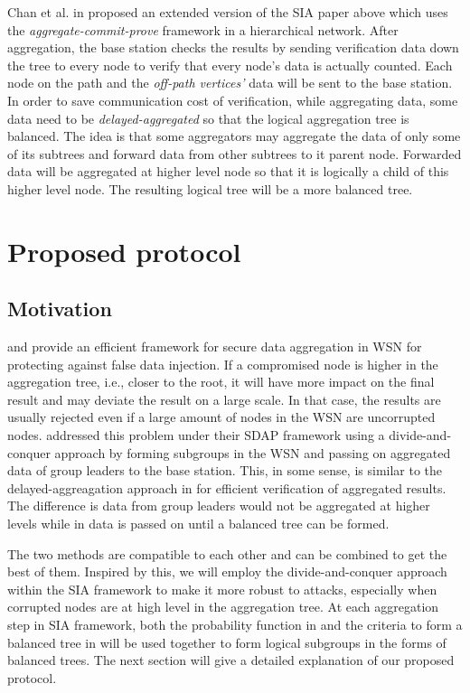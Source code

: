 \documentclass[a4paper]{article}
\begin{document}
Chan et al. in \cite{Chan06} proposed an extended version of the SIA paper
above which uses the {\em aggregate-commit-prove} framework in a hierarchical
network. After aggregation, the base station checks the results by sending
verification data down the tree to every node to verify that every node's data
is actually counted. Each node on the path and the {\em off-path vertices'}
data will be sent to the base station.  In order to save communication cost of
verification, while aggregating data, some data need to be {\em
  delayed-aggregated} so that the logical aggregation tree is balanced.  The
idea is that some aggregators may aggregate the data of only some of its
subtrees and forward data from other subtrees to it parent node. Forwarded
data will be aggregated at higher level node so that it is logically a child
of this higher level node. The resulting logical tree will be a more balanced
tree.

\section{Proposed protocol}
\label{sec:protocol}

\subsection{Motivation}

\cite{SIA} and \cite{Chan06} provide an efficient framework for secure data
aggregation in WSN for protecting against false data injection. If a
compromised node is higher in the aggregation tree, i.e., closer to the root,
it will have more impact on the final result and may deviate the result on a
large scale.  In that case, the results are usually rejected even if a large
amount of nodes in the WSN are uncorrupted nodes. \cite{SDAP} addressed this
problem under their SDAP framework using a divide-and-conquer approach by
forming subgroups in the WSN and passing on aggregated data of group leaders
to the base station. This, in some sense, is similar to the
delayed-aggreagation approach in \cite{Chan06} for efficient verification of
aggregated results. The difference is data from group leaders would not be
aggregated at higher levels while in \cite{Chan06} data is passed on until a
balanced tree can be formed.

The two methods are compatible to each other and can be combined to get the
best of them. Inspired by this, we will employ the divide-and-conquer approach
within the SIA framework to make it more robust to attacks, especially when
corrupted nodes are at high level in the aggregation tree. At each aggregation
step in SIA framework, both the probability function in \cite{Chan06} and the
criteria to form a balanced tree in \cite{SDAP} will be used together to form
logical subgroups in the forms of balanced trees. The next section will give a
detailed explanation of our proposed protocol.
\end{document}
